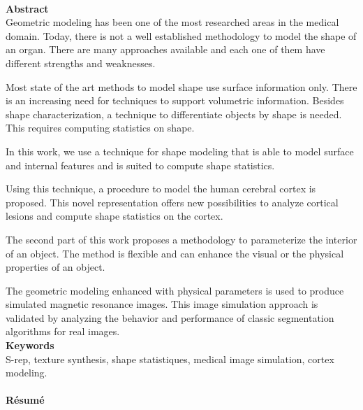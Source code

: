 \newpage
\ifodd \thepage ~\newpage ~\fi

\pagestyle{empty}

\begin{changemargin}{-2cm}{-1cm}

\textbf{Abstract} \\

Geometric modeling has been one of the most researched areas 
in the medical domain.
Today, there is not a well established methodology to model the shape of an organ. 
There are many approaches available and each one of them have different strengths and weaknesses.

Most state of the art methods to model shape use surface information only.
There is an increasing need for techniques to support volumetric information.
Besides shape characterization, a technique to differentiate objects by shape is needed.
This requires computing statistics on shape.


In this work, we use a technique for shape modeling that is
able to model surface and internal features and 
is suited to compute shape statistics.

Using this technique, a procedure to model the human cerebral cortex is proposed. 
This novel representation offers new possibilities to analyze cortical lesions
and compute shape statistics on the cortex.

The second part of this work proposes a methodology to 
parameterize the interior of an object.
The method is flexible and can 
enhance the visual or the physical properties of an object.

The geometric modeling enhanced with physical parameters is used 
to produce simulated magnetic resonance images.
This image simulation approach is validated by analyzing the behavior and performance of classic segmentation algorithms for real images.\\

\textbf{Keywords}\\
S-rep, texture synthesis, shape statistiques, medical image simulation, cortex modeling.\\
\\

\textbf{R\'esum\'e} \\


\end{changemargin}
